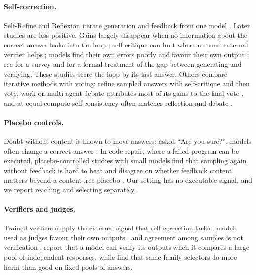 \documentclass[11pt]{article}
\begin{document}
\paragraph{Self-correction.}
Self-Refine and Reflexion iterate generation and feedback from one model \citep{madaan2023selfrefine,shinn2023reflexion}.
Later studies are less positive.
Gains largely disappear when no information about the correct answer leaks into the loop \citep{huang2024cannot}; self-critique can hurt where a sound external verifier helps \citep{stechly2024selfverification}; models find their own errors poorly \citep{tyen2024cannot} and favour their own output \citep{xu2024pride}; see \citet{kamoi2024when} for a survey and \citet{song2024mindgap} for a formal treatment of the gap between generating and verifying.
These studies score the loop by its last answer.
Others compare iterative methods with voting: \citet{bilal2026refining} refine sampled answers with self-critique and then vote, work on multi-agent debate attributes most of its gains to the final vote \citep{smit2024mad,choi2025debate}, and at equal compute self-consistency often matches reflection and debate \citep{wang2024token}.

\paragraph{Placebo controls.}
Doubt without content is known to move answers: asked ``Are you sure?'', models often change a correct answer \citep{laban2024flipflop}.
In code repair, where a failed program can be executed, placebo-controlled studies with small models find that sampling again without feedback is hard to beat and disagree on whether feedback content matters beyond a content-free placebo \citep{iscan2026falsification,iscan2026form,verma2026blind}.
Our setting has no executable signal, and we report reaching and selecting separately.

\paragraph{Verifiers and judges.}
Trained verifiers supply the external signal that self-correction lacks \citep{lightman2024verify}; models used as judges favour their own outputs \citep{zheng2023judging,panickssery2024evaluators}, and agreement among samples is not verification \citep{denisov2026consensus}.
\citet{zhao2025sample} report that a model can verify its outputs when it compares a large pool of independent responses, while \citet{hu2026oracle} find that same-family selectors do more harm than good on fixed pools of answers.
\end{document}
